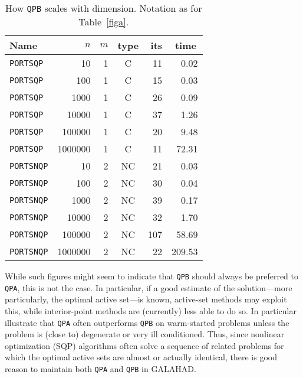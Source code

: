 \documentclass[twoside]{article}
\newcommand{\gal}{{\sf GALAHAD}}
\begin{document}
\begin{table}[htb]
\begin{center}
\begin{tabular}[c]{|lrrc|rr|}
\hline
Name      & $n$ & $m$ & type & its & time\, \\
\hline
{\tt PORTSQP}  & 10 & 1  & C & 11    & {0.02} \\
{\tt PORTSQP}  & 100 & 1  & C &  15   & {0.03} \\
{\tt PORTSQP}  & 1000 & 1  & C &  26   & {0.09} \\
{\tt PORTSQP}  & 10000 & 1  & C &  37   & {1.26} \\
{\tt PORTSQP}  & 100000 & 1  & C &  20   & {9.48} \\
{\tt PORTSQP}  & 1000000 & 1  & C &  11   & {72.31} \\
\hline
{\tt PORTSNQP}  & 10 & 2  & NC & 21    & {0.03} \\
{\tt PORTSNQP}  & 100 & 2  & NC &  30   & {0.04} \\
{\tt PORTSNQP}  & 1000 & 2  & NC &  39   & {0.17} \\
{\tt PORTSNQP}  & 10000 & 2  & NC &  32   & {1.70} \\
{\tt PORTSNQP}  & 100000 & 2  & NC &  107   & { 58.69} \\
{\tt PORTSNQP}  & 1000000 & 2  & NC &  22   & {209.53} \\
\hline
\end{tabular}
\end{center}
\caption{\label{figb} How {\tt QPB} scales with dimension.
Notation as for Table~\ref{figa}.}
\end{table}

While such figures might seem to indicate that {\tt QPB} should always
be preferred to {\tt QPA}, this is not the case. In particular, if a
good estimate of the solution---more particularly, the optimal active
set---is known, active-set methods may exploit this,
while interior-point methods
are (currently) less able to do so. In particular
 illustrate that {\tt QPA} often outperforms {\tt QPB}
on warm-started problems unless the problem is (close to) degenerate or
very ill conditioned. Thus, since nonlinear optimization (SQP) algorithms
often solve a sequence of related problems for which the optimal active sets
are almost or actually identical, there is good reason to maintain both
{\tt QPA} and {\tt QPB} in \gal.
\end{document}
